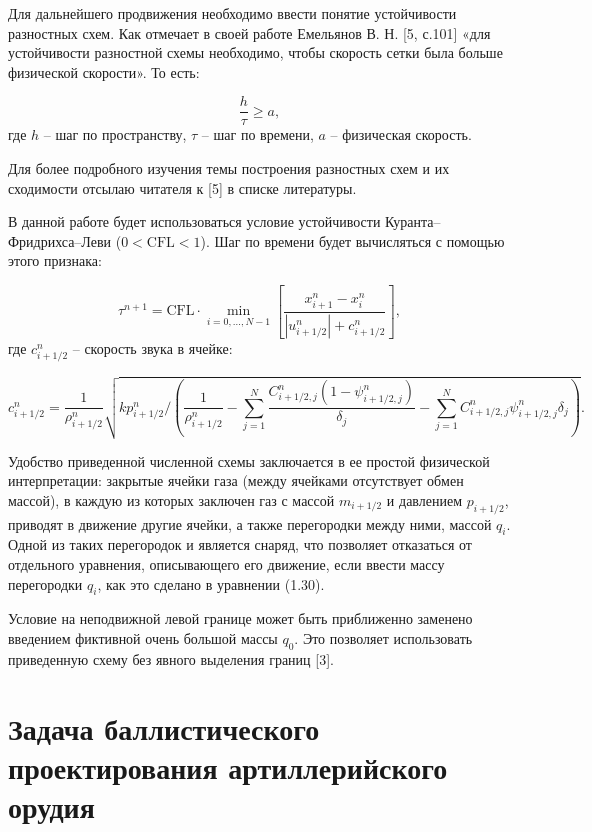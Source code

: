 \documentclass[14pt, a4paper]{report} %
\begin{document}
Для дальнейшего продвижения необходимо ввести понятие устойчивости разностных схем. Как отмечает в своей работе Емельянов В. Н. [5, с.101] «для устойчивости разностной схемы необходимо, чтобы скорость сетки была больше физической скорости». То есть:

\[
\frac{h}{\tau} \geq a,
\]
где \( h \) -- шаг по пространству, \( \tau \) -- шаг по времени, \( a \) -- физическая скорость.

Для более подробного изучения темы построения разностных схем и их сходимости отсылаю читателя к [5] в списке литературы.

В данной работе будет использоваться условие устойчивости Куранта--Фридрихса--Леви (\(0 < \text{CFL} < 1\)). Шаг по времени 
будет вычисляться с помощью этого признака:

\begin{equation}
\tau^{n+1} = \text{CFL} \cdot \min_{i=0,\ldots,N-1} \left[ \frac{x_{i+1}^n - x_i^n}{|u_{i+1/2}^n| + c_{i+1/2}^n} \right],
\end{equation}
где \(c_{i+1/2}^n\) -- скорость звука в ячейке:

\begin{equation}
c_{i+1/2}^n = \frac{1}{\rho_{i+1/2}^n} \sqrt{k p_{i+1/2}^n / \left( \frac{1}{\rho_{i+1/2}^n} - \sum_{j=1}^N \frac{C_{i+1/2,j}^n (1-\psi_{i+1/2,j}^n)}{\delta_j} - \sum_{j=1}^N C_{i+1/2,j}^n \psi_{i+1/2,j}^n \delta_j \right)}.
\end{equation}

Удобство приведенной численной схемы заключается в ее простой физической интерпретации: закрытые ячейки газа (между ячейками отсутствует обмен массой), в каждую из которых заключен газ с массой \( m_{i+1/2} \) и давлением \( p_{i+1/2} \), приводят в движение другие ячейки, а также перегородки между ними, массой \( q_i \). Одной из таких перегородок и является снаряд, что позволяет отказаться от отдельного уравнения, описывающего его движение, если ввести массу перегородки \( q_i \), как это сделано в уравнении (1.30). 

Условие на неподвижной левой границе может быть приближенно заменено введением фиктивной очень большой массы \( q_0 \). Это позволяет использовать приведенную схему без явного выделения границ [3].

\chapter{Задача баллистического проектирования артиллерийского орудия}
\end{document}
